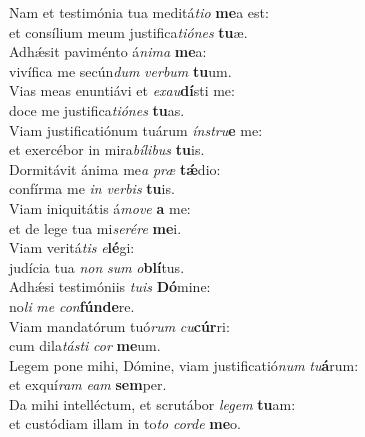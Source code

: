 \evenverse Nam et testimónia tua meditá\textit{ti}\textit{o} \textbf{me}a est:~\*\\
\evenverse et consílium meum justifica\textit{ti}\textit{ó}\textit{nes} \textbf{tu}æ.\\
\oddverse Adhǽsit paviménto á\textit{ni}\textit{ma} \textbf{me}a:~\*\\
\oddverse vivífica me secún\textit{dum} \textit{ver}\textit{bum} \textbf{tu}um.\\
\evenverse Vias meas enuntiávi et \textit{e}\textit{xau}\textbf{dí}sti me:~\*\\
\evenverse doce me justifica\textit{ti}\textit{ó}\textit{nes} \textbf{tu}as.\\
\oddverse Viam justificatiónum tuárum \textit{ín}\textit{stru}\textbf{e} me:~\*\\
\oddverse et exercébor in mira\textit{bí}\textit{li}\textit{bus} \textbf{tu}is.\\
\evenverse Dormitávit ánima me\textit{a} \textit{præ} \textbf{tǽ}dio:~\*\\
\evenverse confírma me \textit{in} \textit{ver}\textit{bis} \textbf{tu}is.\\
\oddverse Viam iniquitátis á\textit{mo}\textit{ve} \textbf{a} me:~\*\\
\oddverse et de lege tua mi\textit{se}\textit{ré}\textit{re} \textbf{me}i.\\
\evenverse Viam veritá\textit{tis} \textit{e}\textbf{lé}gi:~\*\\
\evenverse judícia tua \textit{non} \textit{sum} \textit{o}\textbf{blí}tus.\\
\oddverse Adhǽsi testimóniis \textit{tu}\textit{is} \textbf{Dó}mine:~\*\\
\oddverse no\textit{li} \textit{me} \textit{con}\textbf{fún}\textbf{de}re.\\
\evenverse Viam mandatórum tuó\textit{rum} \textit{cu}\textbf{cúr}ri:~\*\\
\evenverse cum dila\textit{tá}\textit{sti} \textit{cor} \textbf{me}um.\\
\oddverse Legem pone mihi, Dómine, viam justificatió\textit{num} \textit{tu}\textbf{á}rum:~\*\\
\oddverse et exquí\textit{ram} \textit{e}\textit{am} \textbf{sem}per.\\
\evenverse Da mihi intelléctum, et scrutábor \textit{le}\textit{gem} \textbf{tu}am:~\*\\
\evenverse et custódiam illam in to\textit{to} \textit{cor}\textit{de} \textbf{me}o.\\
